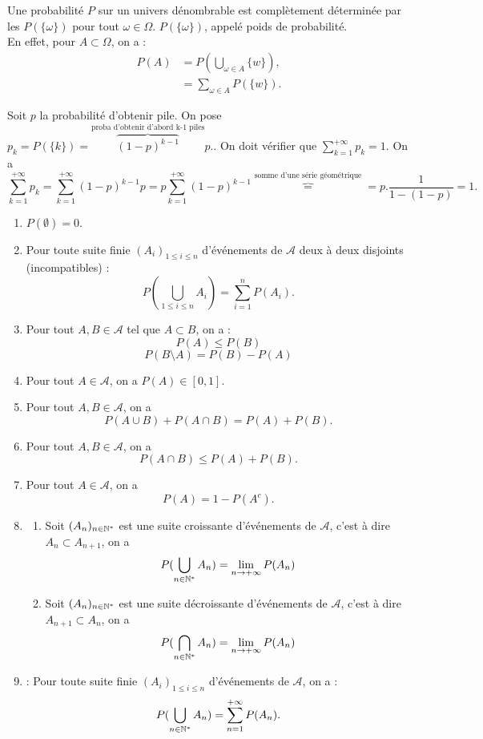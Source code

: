 \documentclass{book}
\begin{document}
\begin{Proposition}
Une probabilité $P$ sur un univers dénombrable est complètement déterminée par les $P(\{\omega\})$ pour tout $\omega \in \Omega$. $P(\{\omega\})$, appelé poids de probabilité.\\
En effet, pour $A \subset \Omega$, on a :
$$\begin{aligned}
P(A)&=P(\bigcup\limits_{\omega\in A}\{w\} ),\\
 &=\sum_{\omega\in A}P(\{w\}).
\end{aligned}$$
\end{Proposition}
\begin{Exemple}
Soit $p$ la probabilité d'obtenir pile. On pose $p_k=P(\{k\})=\overbrace{(1-p)^{k-1}}^{\text{proba d'obtenir d'abord k-1 piles}}p. $. On doit vérifier que $\sum_{k=1}^{+\infty}p_k=1$. 
On a $$\sum_{k=1}^{+\infty}p_k=\sum_{k=1}^{+\infty} (1-p)^{k-1} p = p \sum_{k=1}^{+\infty} (1-p)^{k-1} \overbrace{=}^{\text{somme d'une série géométrique}}=p.\frac{1}{1-(1-p)}=1.$$
\end{Exemple}
\begin{Proposition}
\begin{enumerate}
\item $ P(\emptyset)=0.$
\item Pour toute suite finie $(A_i)_{1\leq i \leq n}$ d'événements de $\mathcal{A}$ deux à deux disjoints (incompatibles) :
$$P(\bigcup_{1\leq i \leq n}A_i)=\sum_{i=1}^{n}P(A_i).$$
\item Pour tout $A,B\in \mathcal{A}$ tel que  $A\subset B$, on a :
$$P(A)\leq P(B)$$
$$P(B\setminus A )=P(B)-P(A)$$
\item Pour tout $A\in \mathcal{A}$, on a $P(A)\in[0,1]$.
\item Pour tout $A,B\in \mathcal{A}$, on a $$P(A\cup B)+P(A\cap B)=P(A)+P(B).$$
\item Pour tout $A,B\in \mathcal{A}$, on a $$P(A\cap B)\leq P(A)+P(B).$$
\item Pour tout $A\in \mathcal{A}$, on a 
$$P(A)=1-P(A^c).$$
\item {}
\begin{enumerate}
\item  Soit $(A_n)_{n\in\mathbb{N}^*}$ est une suite croissante d'événements de $\mathcal{A}$, c'est à dire $A_n\subset A_{n+1}$, on a
$$P(\bigcup_{n\in\mathbb{N}^*}A_n)=\lim\limits_{n \to +\infty} P(A_n)$$ 
\item Soit $(A_n)_{n\in\mathbb{N}^*}$ est une suite décroissante d'événements de $\mathcal{A}$, c'est à dire $A_{n+1}\subset A_{n}$, on a
$$P(\bigcap_{n\in\mathbb{N}^*}A_n)=\lim\limits_{n \to +\infty} P(A_n)$$ 
\end{enumerate}
\item {} : Pour toute suite finie $(A_i)_{1\leq i \leq n}$ d'événements de $\mathcal{A}$, on a  :
$$P(\bigcup_{n\in\mathbb{N}^*}A_n)=\sum_{n=1}^{+\infty} P(A_n).$$
\end{enumerate}
\end{Proposition}
\end{document}

